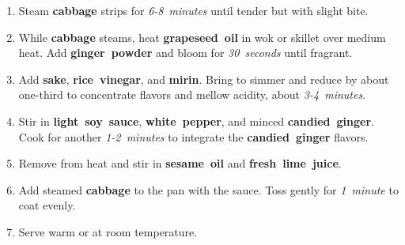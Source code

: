 \documentclass[11pt,letterpaper]{article}
\begin{document}
\begin{enumerate}
    \item Steam \textbf{cabbage} strips for \textit{6-8~minutes} until tender but with slight bite.
    
    \item While \textbf{cabbage} steams, heat \textbf{grapeseed~oil} in wok or skillet over medium heat. Add \textbf{ginger~powder} and bloom for \textit{30~seconds} until fragrant.
    
    \item Add \textbf{sake}, \textbf{rice~vinegar}, and \textbf{mirin}. Bring to simmer and reduce by about one-third to concentrate flavors and mellow acidity, about \textit{3-4~minutes}.
    
    \item Stir in \textbf{light~soy~sauce}, \textbf{white~pepper}, and minced \textbf{candied~ginger}. Cook for another \textit{1-2~minutes} to integrate the \textbf{candied~ginger} flavors.
    
    \item Remove from heat and stir in \textbf{sesame~oil} and \textbf{fresh~lime~juice}.
    
    \item Add steamed \textbf{cabbage} to the pan with the sauce. Toss gently for \textit{1~minute} to coat evenly.
    
    \item Serve warm or at room temperature.
\end{enumerate}

\newpage
\end{document}
